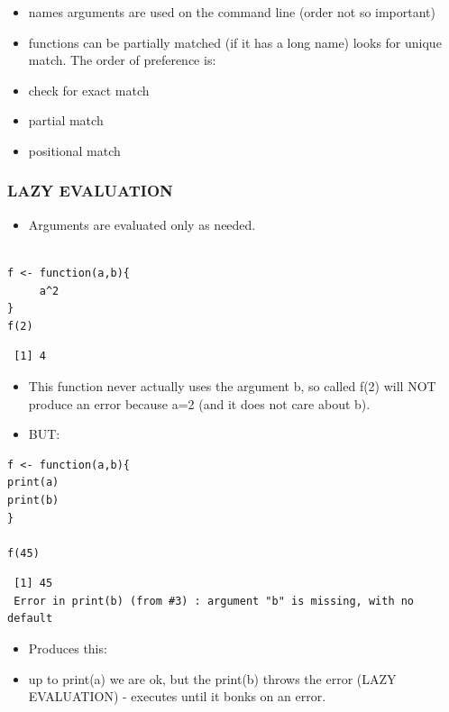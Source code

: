 \documentclass[11pt]{article}
\begin{document}
\begin{itemize}
\item names arguments are used on the command line (order not so important)
\item functions can be partially matched (if it has a long name) looks for unique match. The order of preference is:
\item check for exact match
\item partial match
\item positional match
\end{itemize}
\subsubsection{LAZY EVALUATION}
\label{sec-2-2-2}

\begin{itemize}
\item Arguments are evaluated only as needed.
\end{itemize}

\begin{verbatim}

f <- function(a,b){
     a^2
}
f(2)
\end{verbatim}

\begin{verbatim}
 [1] 4
\end{verbatim}

\begin{itemize}
\item This function never actually uses the argument b, so called f(2)
  will NOT produce an error because a=2 (and it does not care about b).
\item BUT:
\end{itemize}


\begin{verbatim}
f <- function(a,b){
print(a)
print(b)
}

f(45)
\end{verbatim}

\begin{verbatim}
 [1] 45
 Error in print(b) (from #3) : argument "b" is missing, with no default
\end{verbatim}

\begin{itemize}
\item Produces this:
\end{itemize}

\begin{itemize}
\item up to print(a) we are ok, but the print(b) throws the error (LAZY
  EVALUATION) - executes until it bonks on an error.
\end{itemize}
\end{document}
